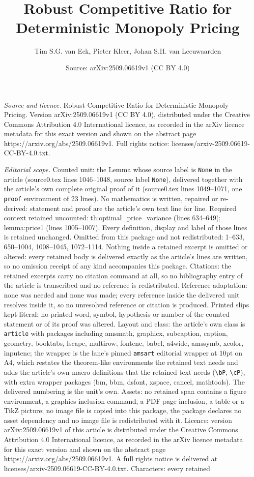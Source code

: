 \documentclass[10pt,a4paper]{amsart}
\title[Robust Competitive Ratio for Deterministic Monopoly Pricing]{Robust Competitive Ratio for Deterministic Monopoly Pricing}
\author{Tim S.G. van Eck, Pieter Kleer, Johan S.H. van Leeuwaarden}
\date{Source: arXiv:2509.06619v1 (CC BY 4.0)}
\begin{document}
\maketitle

\noindent\emph{Source and licence.} Robust Competitive Ratio for Deterministic Monopoly Pricing. Version arXiv:2509.06619v1 (CC BY 4.0), distributed under the Creative Commons Attribution 4.0 International licence, as recorded in the arXiv licence metadata for this exact version and shown on the abstract page https://arxiv.org/abs/2509.06619v1. Full rights notice: licenses/arxiv-2509.06619-CC-BY-4.0.txt.\par\smallskip

\noindent\textit{Editorial scope.} Counted unit: the Lemma whose source label is \texttt{None} in the article (source0.tex lines 1046--1048, source label \texttt{None}), delivered together with the article's own complete original proof of it (source0.tex lines 1049--1071, one \texttt{proof} environment of 23 lines). No mathematics is written, repaired or re-derived: statement and proof are the article's own text line for line. Required context retained uncounted: th:optimal\_price\_variance (lines 634--649); lemma:price1 (lines 1005--1007). Every definition, display and label of those lines is retained unchanged. Omitted from this package and not redistributed: 1--633, 650--1004, 1008--1045, 1072--1114. Nothing inside a retained excerpt is omitted or altered: every retained body is delivered exactly as the article's lines are written, so no omission receipt of any kind accompanies this package. Citations: the retained excerpts carry no citation command at all, so no bibliography entry of the article is transcribed and no reference is redistributed. Reference adaptation: none was needed and none was made; every reference inside the delivered unit resolves inside it, so no unresolved reference or citation is produced. Printed slips kept literal: no printed word, symbol, hypothesis or number of the counted statement or of its proof was altered. Layout and class: the article's own class is \texttt{article} with packages including amsmath, graphicx, subcaption, caption, geometry, booktabs, lscape, multirow, fontenc, babel, a4wide, amssymb, xcolor, inputenc; the wrapper is the lane's pinned \texttt{amsart} editorial wrapper at 10pt on A4, which restates the theorem-like environments the retained text needs and adds the article's own macro definitions that the retained text needs (\texttt{\textbackslash bP}, \texttt{\textbackslash cP}), with extra wrapper packages (bm, bbm, dsfont, xspace, cancel, mathtools). The delivered numbering is the unit's own. Assets: no retained span contains a figure environment, a graphics-inclusion command, a PDF-page inclusion, a table or a TikZ picture; no image file is copied into this package, the package declares no asset dependency and no image file is redistributed with it. Licence: version arXiv:2509.06619v1 of this article is distributed under the Creative Commons Attribution 4.0 International licence, as recorded in the arXiv licence metadata for this exact version and shown on the abstract page https://arxiv.org/abs/2509.06619v1. A full rights notice is delivered at licenses/arxiv-2509.06619-CC-BY-4.0.txt. Characters: every retained 
\end{document}
